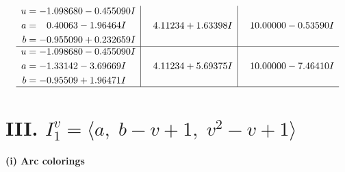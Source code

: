 \documentclass[1p]{elsarticle_modified}
\theoremstyle{definition}
\begin{document}
$$\begin{array}{c|c|c}
\begin{aligned}
u &= -1.098680 - 0.455090 I \\
a &= \phantom{-}0.40063 - 1.96464 I \\
b &= -0.955090 + 0.232659 I\end{aligned}
 & \phantom{-}4.11234 + 1.63398 I & \phantom{-}10.00000 - 0.53590 I \\ \hline\begin{aligned}
u &= -1.098680 - 0.455090 I \\
a &= -1.33142 - 3.69669 I \\
b &= -0.95509 + 1.96471 I\end{aligned}
 & \phantom{-}4.11234 + 5.69375 I & \phantom{-}10.00000 - 7.46410 I\\
 \hline 
 \end{array}$$\newpage\newpage\renewcommand{\arraystretch}{1}
\centering \section*{III. $I^v_{1}= \langle a,\;b- v+1,\;v^2- v+1 \rangle$}
\flushleft \textbf{(i) Arc colorings}\\
\end{document}

